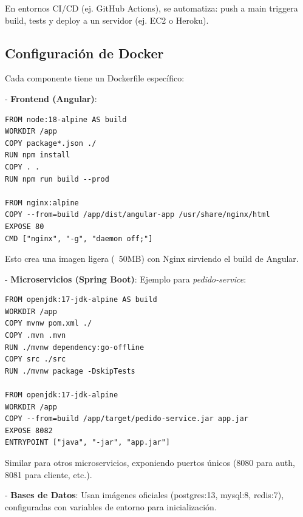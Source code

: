 \documentclass[a4paper,12pt]{article}
\begin{document}
En entornos CI/CD (ej. GitHub Actions), se automatiza: push a main triggera build, tests y deploy a un servidor (ej. EC2 o Heroku).

\subsection{Configuración de Docker}
Cada componente tiene un Dockerfile específico:

- \textbf{Frontend (Angular)}:
\begin{verbatim}
FROM node:18-alpine AS build
WORKDIR /app
COPY package*.json ./
RUN npm install
COPY . .
RUN npm run build --prod

FROM nginx:alpine
COPY --from=build /app/dist/angular-app /usr/share/nginx/html
EXPOSE 80
CMD ["nginx", "-g", "daemon off;"]
\end{verbatim}
Esto crea una imagen ligera (~50MB) con Nginx sirviendo el build de Angular.

- \textbf{Microservicios (Spring Boot)}: Ejemplo para \textit{pedido-service}:
\begin{verbatim}
FROM openjdk:17-jdk-alpine AS build
WORKDIR /app
COPY mvnw pom.xml ./
COPY .mvn .mvn
RUN ./mvnw dependency:go-offline
COPY src ./src
RUN ./mvnw package -DskipTests

FROM openjdk:17-jdk-alpine
WORKDIR /app
COPY --from=build /app/target/pedido-service.jar app.jar
EXPOSE 8082
ENTRYPOINT ["java", "-jar", "app.jar"]
\end{verbatim}
Similar para otros microservicios, exponiendo puertos únicos (8080 para auth, 8081 para cliente, etc.).

- \textbf{Bases de Datos}: Usan imágenes oficiales (postgres:13, mysql:8, redis:7), configuradas con variables de entorno para inicialización.
\end{document}
